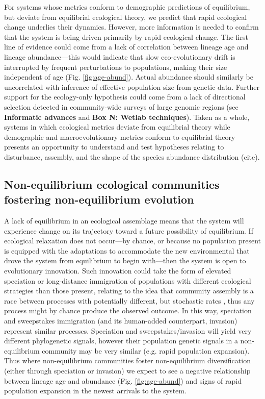 \documentclass[12pt]{article}
\newcounter{Box}
\begin{document}
For systems whose metrics conform to demographic predictions of
equilibrium, but deviate from equilibrial ecological theory, we
predict that rapid ecological change underlies their
dynamics. However, more information is needed to confirm that the
system is being driven primarily by rapid ecological change. The first
line of evidence could come from a lack of correlation between lineage
age and lineage abundance---this would indicate that slow
eco-evolutionary drift is interrupted by frequent perturbations to
populations, making their size independent of age
(Fig. \ref{fig:age-abund}). Actual abundance should similarly be
uncorrelated with inference of effective population size from genetic
data. Further support for the ecology-only hypothesis could come from
a lack of directional selection detected in community-wide surveys of
large genomic regions (see \textbf{Informatic advances} and
\textbf{Box N: Wetlab techniques}). Taken as a whole, systems in which
ecological metrics deviate from equilibrial theory while demographic
and macroevolutionary metrics conform to equilibrial theory presents
an opportunity to understand and test hypotheses relating to
disturbance, assembly, and the shape of the species abundance
distribution (cite).

\subsection{Non-equilibrium ecological communities fostering non-equilibrium evolution}

A lack of equilibrium in an ecological assemblage means that the
system will experience change on its trajectory toward a future
possibility of equilibrium. If ecological relaxation does not
occur---by chance, or because no population present is equipped with
the adaptations to accommodate the new environmental that drove the
system from equilibrium to begin with---then the system is open to
evolutionary innovation.  Such innovation could take the form of
elevated speciation or long-distance immigration of populations with
different ecological strategies than those present, relating to the
idea that community assembly is a race between processes with
potentially different, but stochastic rates \cite{Vanoverbeke2015-ym},
thus any process might by chance produce the observed outcome. In this
way, speciation and sweepstakes immigration (and its human-added
counterpart, invasion) represent similar processes. Speciation and
sweepstakes/invasion will yield very different phylogenetic signals,
however their population genetic signals in a non-equilibrium
community may be very similar (e.g. rapid population expansion). Thus
where non-equilibrium communities foster non-equilibrium
diversification (either through speciation or invasion) we expect to
see a negative relationship between lineage age and abundance (Fig.
\ref{fig:age-abund}) and signs of rapid population expansion in the
newest arrivals to the system.
\end{document}
